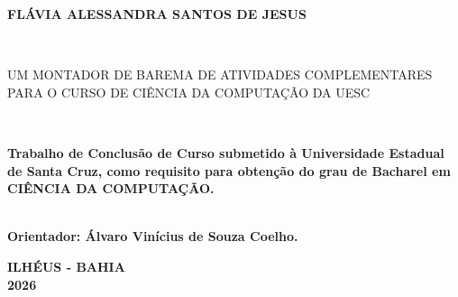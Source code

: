 
\begin{center}

    {\large \begin{large} \bfseries FLÁVIA ALESSANDRA SANTOS DE JESUS\end{large}\\}
    \vspace{8cm}
    {\large\bfseries{\begin{large} UM MONTADOR DE BAREMA DE ATIVIDADES COMPLEMENTARES PARA O CURSO DE
    CIÊNCIA DA COMPUTAÇÃO DA UESC
 \end{large}}\\}
    \vspace{1cm}
    \hspace{.45\linewidth}
    \begin{minipage}{.50\linewidth}

            \textbf{Trabalho de Conclusão de Curso submetido à Universidade Estadual de Santa Cruz,  como requisito 
            para obtenção do grau de Bacharel em  CIÊNCIA DA COMPUTAÇÃO. }

            \textbf{\\ Orientador:  Álvaro Vinícius de Souza Coelho. }
           
    
    \end{minipage}

    \vspace{2cm}
    \vfill
    {\large\bfseries{ ILHÉUS - BAHIA \\ 2026}}
\end{center}

